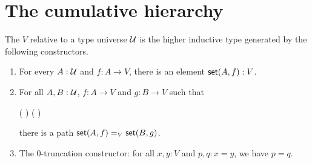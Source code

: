 \documentclass[hott-all.tex]{subfiles}
\begin{document}
\section{The cumulative hierarchy}
% 
% 
\begin{defn}
  The 
  $V$ relative to a type universe $\UU$ is the
  higher inductive type generated by the following constructors.
  \begin{enumerate}
  \item For every $A : \UU$ and $f : A \to V$, there is an element $\vset(A, f) : V$.
  \item For all $A, B : \UU$, $f : A \to V$ and $g : B \to V$ such that
    \begin{narrowmultline} 
      \big(  \big) \land \narrowbreak
      \big(  \big)
    \end{narrowmultline}
    there is a path $\id[V]{\vset(A,f)}{\vset(B,g)}$.
  \item The 0-truncation constructor: for all $x,y:V$ and $p,q:x=y$, we have $p=q$.
  \end{enumerate}
\end{defn}
% 
% 
\end{document}
